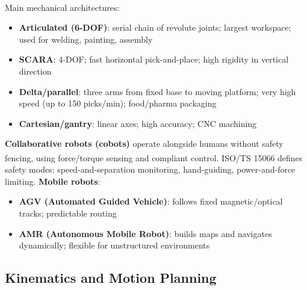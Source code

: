 \begin{tcbitemize}[ skin=sectionraster ]
    \tcbitem[title={Industrial Robot Taxonomy}, raster multicolumn=3]
    Main mechanical architectures\textsuperscript{\cite[][pp.~1--20]{sicilianoRobotics2009}}:
    \begin{itemize}
        \item \textbf{Articulated (6-DOF)}: serial chain of revolute joints; largest workspace; used for welding, painting, assembly
        \item \textbf{SCARA}: 4-DOF; fast horizontal pick-and-place; high rigidity in vertical direction
        \item \textbf{Delta/parallel}: three arms from fixed base to moving platform; very high speed (up to 150 picks/min); food/pharma packaging
        \item \textbf{Cartesian/gantry}: linear axes; high accuracy; CNC machining
    \end{itemize}

    \tcbitem[title={Cobots and Mobile Robots}, raster multicolumn=3]
    \textbf{Collaborative robots (cobots)} operate alongside humans without safety fencing, using force/torque sensing and compliant control\textsuperscript{\cite[][pp.~15--25]{benariElementsRobotics2017}}.
    ISO/TS 15066 defines safety modes: speed-and-separation monitoring, hand-guiding, power-and-force limiting.
    \textbf{Mobile robots}:
    \begin{itemize}
        \item \textbf{AGV (Automated Guided Vehicle)}: follows fixed magnetic/optical tracks; predictable routing
        \item \textbf{AMR (Autonomous Mobile Robot)}: builds maps and navigates dynamically; flexible for unstructured environments
    \end{itemize}
\end{tcbitemize}

\subsection{Kinematics and Motion Planning}

